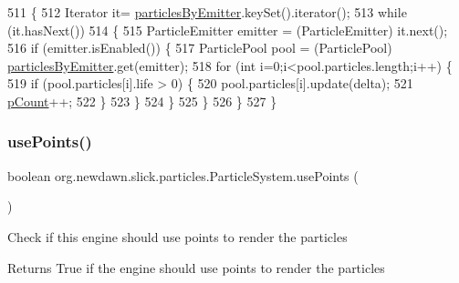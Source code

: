 \begin{DoxyCode}
511         \{
512             Iterator it= \mbox{\hyperlink{classorg_1_1newdawn_1_1slick_1_1particles_1_1_particle_system_aec10bb63c0065ee17c8d8133936f5db6}{particlesByEmitter}}.keySet().iterator();
513             \textcolor{keywordflow}{while} (it.hasNext())
514             \{
515                 ParticleEmitter emitter = (ParticleEmitter) it.next();
516                 \textcolor{keywordflow}{if} (emitter.isEnabled()) \{
517                     ParticlePool pool = (ParticlePool) \mbox{\hyperlink{classorg_1_1newdawn_1_1slick_1_1particles_1_1_particle_system_aec10bb63c0065ee17c8d8133936f5db6}{particlesByEmitter}}.get(emitter);
518                     \textcolor{keywordflow}{for} (\textcolor{keywordtype}{int} i=0;i<pool.particles.length;i++) \{
519                         \textcolor{keywordflow}{if} (pool.particles[i].life > 0) \{
520                             pool.particles[i].update(delta);
521                             \mbox{\hyperlink{classorg_1_1newdawn_1_1slick_1_1particles_1_1_particle_system_ad811064cd2cca4105b49ad71a47a72aa}{pCount}}++;
522                         \}
523                     \}
524                 \}
525             \}
526         \}
527     \}
\end{DoxyCode}
\mbox{\label{classorg_1_1newdawn_1_1slick_1_1particles_1_1_particle_system_ad0949468683934abaf4fb0f3ae38004b}} 
\subsubsection{\texorpdfstring{use\+Points()}{usePoints()}}
{\footnotesize\ttfamily boolean org.\+newdawn.\+slick.\+particles.\+Particle\+System.\+use\+Points (\begin{DoxyParamCaption}{ }\end{DoxyParamCaption})\hspace{0.3cm}{\ttfamily [inline]}}

Check if this engine should use points to render the particles

\begin{DoxyReturn}{Returns}
True if the engine should use points to render the particles 
\end{DoxyReturn}

